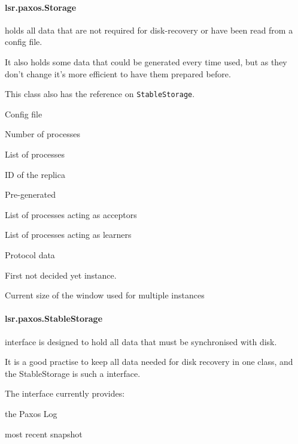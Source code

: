\paragraph{\normalfont \ttfamily lsr.paxos.Storage}
holds all data that are not required for disk-recovery or have been read from a config file.

It also holds some data that could be generated every time used, but as they don't change it's more efficient to have them prepared before.

This class also has the reference on \texttt{StableStorage}.

\begin{description}
\setlength{\itemindent}{0pt}
  \item[]{\tiny\vspace{-0.5em}Config file\vspace{-0.5em}}
    \item[n] Number of processes 
    \item[processes] List of processes
    \item[localID] ID of the replica
  \item[]{\tiny\vspace{-0.5em}Pre-generated\vspace{-0.5em}}
    \item[acceptors] List of processes acting as acceptors
    \item[learners]  List of processes acting as learners
  \item[]{\tiny\vspace{-0.5em}Protocol data\vspace{-0.5em}}
    \item[firstUncommited] First not decided yet instance.
    \item[windowSize] Current size of the window used for multiple instances
\end{description}

\paragraph{\normalfont \ttfamily lsr.paxos.StableStorage} interface is designed to hold all data that must be synchronised with disk.

It is a good practise to keep all data needed for disk recovery in one class, and the StableStorage is such a interface.

The interface currently provides:
\begin{description}
\setlength{\itemindent}{0pt}
  \item[log] the Paxos Log
  \item[snapshot] most recent snapshot
\end{description}


